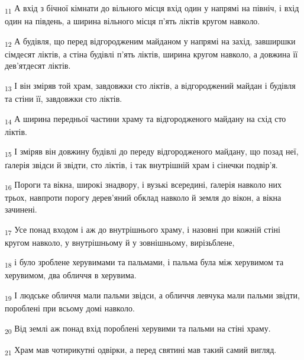\begin{tcolorbox}
\textsubscript{11} А вхід з бічної кімнати до вільного місця вхід один у напрямі на північ, і вхід один на південь, а ширина вільного місця п'ять ліктів кругом навколо.
\end{tcolorbox}
\begin{tcolorbox}
\textsubscript{12} А будівля, що перед відгородженим майданом у напрямі на захід, завширшки сімдесят ліктів, а стіна будівлі п'ять ліктів, ширина кругом навколо, а довжина її дев'ятдесят ліктів.
\end{tcolorbox}
\begin{tcolorbox}
\textsubscript{13} І він зміряв той храм, завдовжки сто ліктів, а відгороджений майдан і будівля та стіни її, завдовжки сто ліктів.
\end{tcolorbox}
\begin{tcolorbox}
\textsubscript{14} А ширина передньої частини храму та відгородженого майдану на схід сто ліктів.
\end{tcolorbox}
\begin{tcolorbox}
\textsubscript{15} І зміряв він довжину будівлі до переду відгородженого майдану, що позад неї, ґалерія звідси й звідти, сто ліктів, і так внутрішній храм і сінечки подвір'я.
\end{tcolorbox}
\begin{tcolorbox}
\textsubscript{16} Пороги та вікна, широкі знадвору, і вузькі всередині, ґалерія навколо них трьох, навпроти порогу дерев'яний обклад навколо й земля до вікон, а вікна зачинені.
\end{tcolorbox}
\begin{tcolorbox}
\textsubscript{17} Усе понад входом і аж до внутрішнього храму, і назовні при кожній стіні кругом навколо, у внутрішньому й у зовнішньому, вирізьблене,
\end{tcolorbox}
\begin{tcolorbox}
\textsubscript{18} і було зроблене херувимами та пальмами, і пальма була між херувимом та херувимом, два обличчя в херувима.
\end{tcolorbox}
\begin{tcolorbox}
\textsubscript{19} І людське обличчя мали пальми звідси, а обличчя левчука мали пальми звідти, пороблені при всьому домі навколо.
\end{tcolorbox}
\begin{tcolorbox}
\textsubscript{20} Від землі аж понад вхід пороблені херувими та пальми на стіні храму.
\end{tcolorbox}
\begin{tcolorbox}
\textsubscript{21} Храм мав чотирикутні одвірки, а перед святині мав такий самий вигляд.
\end{tcolorbox}
